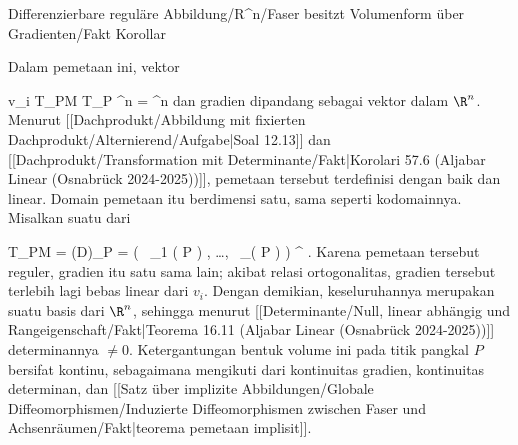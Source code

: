 {Differenzierbare reguläre Abbildung/R^n/Faser besitzt Volumenform über Gradienten/Fakt}
{Korollar}
{}
{

\faktzusatz {}
\faktzusatz {}

}
{

Dalam pemetaan ini, vektor

\mavergleichskette
{\vergleichskette
{ v_i
}
{ \in }{ T_PM
}
{ \subseteq }{ T_P \R^n
}
{ =   }{ \R^n
}
{   }{
}
}
{}{}{}
dan gradien dipandang sebagai vektor dalam $\R^n$. Menurut
[[Dachprodukt/Abbildung mit fixierten Dachprodukt/Alternierend/Aufgabe|Soal 12.13]]
dan
[[Dachprodukt/Transformation mit Determinante/Fakt|Korolari 57.6 (Aljabar Linear (Osnabrück 2024-2025))]],
pemetaan tersebut terdefinisi dengan baik dan linear. Domain pemetaan itu berdimensi satu, sama seperti kodomainnya. Misalkan
 suatu
dari

\mavergleichskettedisp
{\vergleichskette
{ T_PM
}
{ =} {   \left(D\varphi\right)_{P}
}
{ =} { (
 \, \varphi_1  (  P ) , \ldots ,
 \, \varphi_\ell ( P ) ) ^{ { \perp  } }
}
{ } {
}
{ } {
}
}
{}{}{.}
Karena pemetaan tersebut reguler, gradien itu
satu sama lain; akibat relasi ortogonalitas, gradien tersebut terlebih lagi bebas linear dari $v_i$. Dengan demikian, keseluruhannya merupakan suatu basis dari $\R^n$, sehingga menurut
[[Determinante/Null, linear abhängig und Rangeigenschaft/Fakt|Teorema 16.11 (Aljabar Linear (Osnabrück 2024-2025))]]
determinannya $\neq 0$. Ketergantungan bentuk volume ini pada titik pangkal $P$ bersifat kontinu, sebagaimana mengikuti dari kontinuitas gradien, kontinuitas determinan, dan
[[Satz über implizite Abbildungen/Globale Diffeomorphismen/Induzierte Diffeomorphismen zwischen Faser und Achsenräumen/Fakt|teorema pemetaan implisit]].

}

